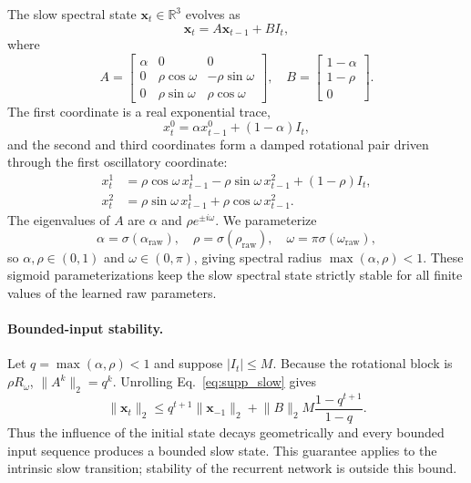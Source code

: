\documentclass[letterpaper]{article}
\begin{document}
The slow spectral state $\mathbf{x}_t\in\mathbb{R}^3$ evolves as
\begin{equation}
\mathbf{x}_t = A\mathbf{x}_{t-1} + B I_t,
\label{eq:supp_slow}
\end{equation}
where
\begin{equation}
A =
\begin{bmatrix}
\alpha & 0 & 0 \\
0 & \rho\cos\omega & -\rho\sin\omega \\
0 & \rho\sin\omega & \rho\cos\omega
\end{bmatrix}, \quad
B =
\begin{bmatrix}
1-\alpha \\
1-\rho \\
0
\end{bmatrix}.
\label{eq:supp_AB}
\end{equation}
The first coordinate is a real exponential trace,
\begin{equation}
x_t^0 = \alpha x_{t-1}^0 + (1-\alpha)I_t,
\label{eq:supp_real_mode}
\end{equation}
and the second and third coordinates form a damped rotational pair driven through the first oscillatory coordinate:
\begin{align}
x_t^1 &= \rho\cos\omega\, x_{t-1}^1 - \rho\sin\omega\, x_{t-1}^2 + (1-\rho)I_t, \\
x_t^2 &= \rho\sin\omega\, x_{t-1}^1 + \rho\cos\omega\, x_{t-1}^2.
\label{eq:supp_rot_mode}
\end{align}
The eigenvalues of $A$ are $\alpha$ and $\rho e^{\pm i\omega}$. We parameterize
\begin{equation}
\alpha=\sigma(\alpha_{\mathrm{raw}}),\quad
\rho=\sigma(\rho_{\mathrm{raw}}),\quad
\omega=\pi\sigma(\omega_{\mathrm{raw}}),
\label{eq:supp_param}
\end{equation}
so $\alpha,\rho\in(0,1)$ and $\omega\in(0,\pi)$, giving spectral radius $\max(\alpha,\rho)<1$. These sigmoid parameterizations keep the slow spectral state strictly stable for all finite values of the learned raw parameters.

\paragraph{Bounded-input stability.}
Let $q=\max(\alpha,\rho)<1$ and suppose $|I_t|\leq M$. Because the rotational block is $\rho R_\omega$, $\lVert A^k\rVert_2=q^k$. Unrolling Eq.~\eqref{eq:supp_slow} gives
\begin{equation}
\lVert\mathbf{x}_t\rVert_2
\leq q^{t+1}\lVert\mathbf{x}_{-1}\rVert_2
+\lVert B\rVert_2 M\frac{1-q^{t+1}}{1-q}.
\label{eq:supp_bibo_bound}
\end{equation}
Thus the influence of the initial state decays geometrically and every bounded input sequence produces a bounded slow state. This guarantee applies to the intrinsic slow transition; stability of the recurrent network is outside this bound.
\end{document}

